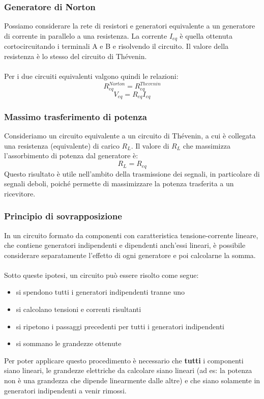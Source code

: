 \documentclass{article}
\begin{document}
\subsubsection{Generatore di Norton}
Possiamo considerare la rete di resistori e generatori equivalente a un generatore di corrente in parallelo a una resistenza.
La corrente $I_{eq}$ è quella ottenuta cortocircuitando i terminali A e B e risolvendo il circuito. Il valore della resistenza è lo stesso del circuito di Thévenin.\\\\
Per i due circuiti equivalenti valgono quindi le relazioni:
$$ R_{eq}^{Norton} = R_{eq}^{Thevenin}$$
$$ V_{eq} = R_{eq}I_{eq} $$

\subsubsection{Massimo trasferimento di potenza}
Consideriamo un circuito equivalente a un circuito di Thévenin, a cui è collegata una resistenza (equivalente) di carico $R_L$.
Il valore di $R_L$ che massimizza l'assorbimento di potenza dal generatore è:
$$ R_L=R_{eq} $$
Questo risultato è utile nell'ambito della trasmissione dei segnali, in particolare di segnali deboli, poiché permette di massimizzare la potenza trasferita a un ricevitore.

\subsubsection{Principio di sovrapposizione}
In un circuito formato da componenti con caratteristica tensione-corrente lineare, che contiene generatori indipendenti e dipendenti anch'essi lineari, è possibile considerare separatamente l'effetto di ogni generatore e poi calcolarne la somma.\\\\
Sotto queste ipotesi, un circuito può essere risolto come segue:
\begin{itemize}
    \item si spendono tutti i generatori indipendenti tranne uno
    \item si calcolano tensioni e correnti risultanti
    \item si ripetono i passaggi precedenti per tutti i generatori indipendenti
    \item si sommano le grandezze ottenute
\end{itemize}
Per poter applicare questo procedimento è necessario che \textbf{tutti} i componenti siano lineari, le grandezze elettriche da calcolare siano lineari (ad es: la potenza non è una grandezza che dipende linearmente dalle altre) e che siano solamente in generatori indipendenti a venir rimossi.
\end{document}
